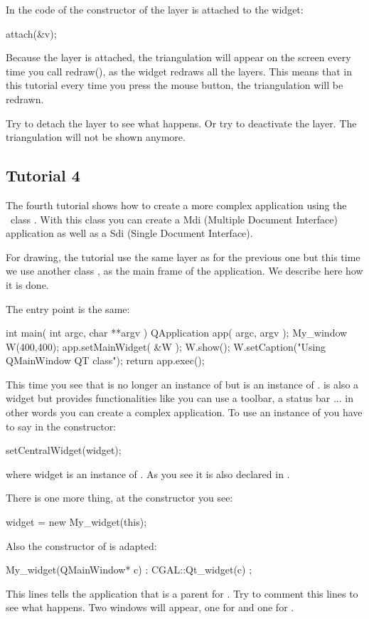 In the code of the constructor of  the layer is attached to
the widget:
\begin{ccExampleCode}
attach(&v);
\end{ccExampleCode}
Because the layer is attached, the triangulation will appear on the
screen every time you call redraw(), as the widget redraws all the
layers. This means that in this tutorial every time you press the mouse
button, the triangulation will be redrawn.

Try to detach the layer to see what happens. Or try to deactivate
the layer. The triangulation will not be shown anymore.

\subsection*{Tutorial 4}

The fourth tutorial shows how to create a more complex application
using the \qt\ class . With this class you can create a
{\sc Mdi} (Multiple Document Interface) application as well as a {\sc
Sdi} (Single Document Interface).

For drawing, the tutorial use the same layer as for the previous one
but this time we use another class , as the main frame of
the application. We describe here how it is done.

The entry point is the same:
\begin{ccExampleCode}
int main( int argc, char **argv )
{
    QApplication app( argc, argv );
    My_window W(400,400);
    app.setMainWidget( &W );
    W.show();
    W.setCaption("Using QMainWindow QT class");
    return app.exec();
}
\end{ccExampleCode}
This time you see that  is no longer an instance of
 but is an instance of
.  is also a widget but
provides functionalities like you can use a toolbar, a status bar ... in other
words you can create a complex application. To use an instance of
 you have to say in the constructor:
\begin{ccExampleCode}
setCentralWidget(widget);
\end{ccExampleCode}
where widget is an instance of . As you see it is
also declared in .

There is one more thing, at the constructor you see:
\begin{ccExampleCode}
widget = new My_widget(this);
\end{ccExampleCode}
Also the constructor of  is adapted:
\begin{ccExampleCode}
My_widget(QMainWindow* c) : CGAL::Qt_widget(c) {};
\end{ccExampleCode}
This lines tells the application that  is a parent for
. Try to comment this lines to see what happens. Two
windows will appear, one for  and one for .

